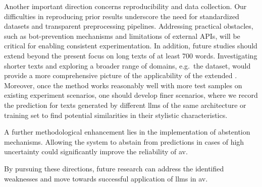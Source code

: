 Another important direction concerns reproducibility and data collection. 
Our difficulties in reproducing prior results underscore the need for standardized datasets and transparent preprocessing pipelines. 
Addressing practical obstacles, such as bot-prevention mechanisms and limitations of external APIs, will be critical for enabling consistent experimentation. 
In addition, future studies should extend beyond the present focus on long texts of at least 700 words. 
Investigating shorter texts and exploring a broader range of domains, e.g.\ the \dataPan{} dataset, would provide a more comprehensive picture of the applicability of the extended \impAppr{}.
Moreover, once the method works reasonably well with more test samples on existing experiment scenarios, one should develop finer scenarios, where we record the prediction for texts generated by different \acp{llm} of the same architecture or training set to find potential similarities in their stylistic characteristics.

A further methodological enhancement lies in the implementation of abstention mechanisms. 
Allowing the system to abstain from predictions in cases of high uncertainty could significantly improve the reliability of \ac{av}. 

By pursuing these directions, future research can address the identified weaknesses and move towards successful application of \acp{llm} in \ac{av}.




% 





